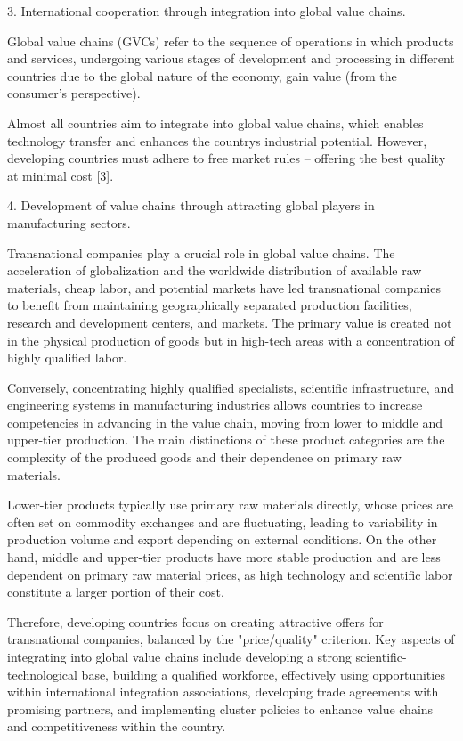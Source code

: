 3. International cooperation through integration into global value
chains.

Global value chains (GVCs) refer to the sequence of operations in which
products and services, undergoing various stages of development and
processing in different countries due to the global nature of the
economy, gain value (from the consumer's perspective).

Almost all countries aim to integrate into global value chains, which
enables technology transfer and enhances the country\textquotesingle s
industrial potential. However, developing countries must adhere to free
market rules -- offering the best quality at minimal cost {[}3{]}.

4. Development of value chains through attracting global players in
manufacturing sectors.

Transnational companies play a crucial role in global value chains. The
acceleration of globalization and the worldwide distribution of
available raw materials, cheap labor, and potential markets have led
transnational companies to benefit from maintaining geographically
separated production facilities, research and development centers, and
markets. The primary value is created not in the physical production of
goods but in high-tech areas with a concentration of highly qualified
labor.

Conversely, concentrating highly qualified specialists, scientific
infrastructure, and engineering systems in manufacturing industries
allows countries to increase competencies in advancing in the value
chain, moving from lower to middle and upper-tier production. The main
distinctions of these product categories are the complexity of the
produced goods and their dependence on primary raw materials.

Lower-tier products typically use primary raw materials directly, whose
prices are often set on commodity exchanges and are fluctuating, leading
to variability in production volume and export depending on external
conditions. On the other hand, middle and upper-tier products have more
stable production and are less dependent on primary raw material prices,
as high technology and scientific labor constitute a larger portion of
their cost.

Therefore, developing countries focus on creating attractive offers for
transnational companies, balanced by the "price/quality" criterion. Key
aspects of integrating into global value chains include developing a
strong scientific-technological base, building a qualified workforce,
effectively using opportunities within international integration
associations, developing trade agreements with promising partners, and
implementing cluster policies to enhance value chains and
competitiveness within the country.

